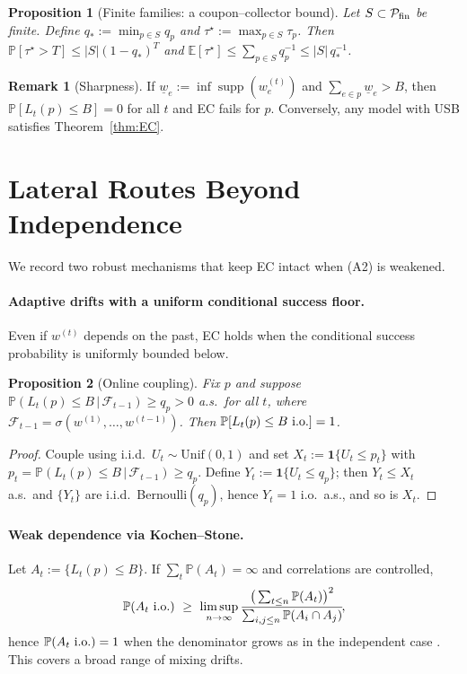 \documentclass[11pt]{article}
\theoremstyle{plain}
\newtheorem{proposition}{Proposition}
\theoremstyle{definition}
\newtheorem{remark}{Remark}
\newcommand{\Prb}{\mathbb{P}}
\newcommand{\E}{\mathbb{E}}
\newcommand{\io}{\text{\rm i.o.}}
\begin{document}
\begin{proposition}[Finite families: a coupon–collector bound]\label{prop:family}
Let $S\subset \mathcal{P}_{\rm fin}$ be finite. Define $q_*:=\min_{p\in S} q_p$ and
\(\tau^\star:=\max_{p\in S}\tau_p\).
Then \(\Prb[\tau^\star > T] \le |S|(1-q_*)^T\) and \(\E[\tau^\star]\le \sum_{p\in S} q_p^{-1}\le |S|\,q_*^{-1}\).
\end{proposition}

\begin{remark}[Sharpness]
If $\underline{w}_e:=\inf \operatorname{supp}(w_e^{(t)})$ and $\sum_{e\in p} \underline{w}_e>B$, then
\(\Prb[L_t(p)\le B]=0\) for all $t$ and EC fails for $p$. Conversely, any model with USB satisfies Theorem~\ref{thm:EC}.
\end{remark}

\section{Lateral Routes Beyond Independence}
We record two robust mechanisms that keep EC intact when \textup{(A2)} is weakened.

\paragraph{Adaptive drifts with a uniform conditional success floor.}
Even if $w^{(t)}$ depends on the past, EC holds when the conditional success probability is uniformly bounded below.

\begin{proposition}[Online coupling]\label{prop:coupling}
Fix $p$ and suppose $\Prb(L_t(p)\le B\,|\,\mathcal{F}_{t-1})\ge q_p>0$ a.s.\ for all $t$, where
$\mathcal{F}_{t-1}=\sigma(w^{(1)},\dots,w^{(t-1)})$. Then $\Prb[L_t(p)\le B~\io]=1$.
\end{proposition}

\begin{proof}
Couple using i.i.d.\ $U_t\sim\mathrm{Unif}(0,1)$ and set $X_t:=\mathbf{1}\{U_t\le p_t\}$ with $p_t=\Prb(L_t(p)\le B\,|\,\mathcal{F}_{t-1})\ge q_p$. Define $Y_t:=\mathbf{1}\{U_t\le q_p\}$; then $Y_t\le X_t$ a.s.\ and $\{Y_t\}$ are i.i.d.\ Bernoulli$(q_p)$, hence $Y_t=1$ i.o.\ a.s., and so is $X_t$.
\end{proof}

\paragraph{Weak dependence via Kochen–Stone.}
Let $A_t:=\{L_t(p)\le B\}$. If $\sum_t \Prb(A_t)=\infty$ and correlations are controlled,
\[
\Prb(A_t~\io) \ \ge\ \limsup_{n\to\infty}\frac{\big(\sum_{t\le n}\Prb(A_t)\big)^2}{\sum_{i,j\le n}\Prb(A_i\cap A_j)}\!,
\]
hence $\Prb(A_t~\io)=1$ when the denominator grows as in the independent case \cite{KochenStone}. This covers a broad range of mixing drifts.
\end{document}

